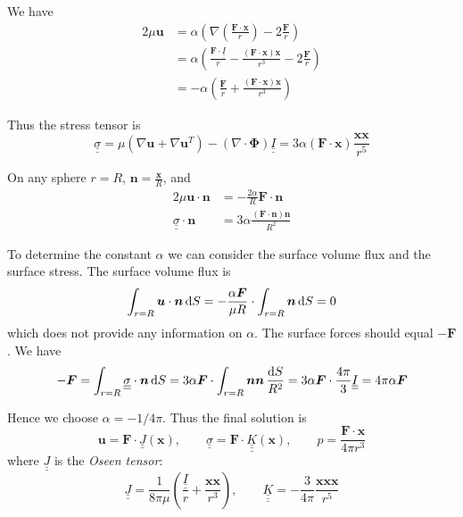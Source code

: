 \documentclass{jknotes}
\newcommand{\dunder}[1]{\underline{\underline{#1}}}
\newcommand{\x}{\bm{x}}
\begin{document}
We have
\begin{equation}
	\begin{aligned}
		2\mu \bm{u} &= \alpha \left( \nabla \left( \frac{\bm{F} \cdot
			\x}{r}\right) - 2
		\frac{\bm{F}}{r}\right) \\
		&= \alpha \left( \frac{\bm{F} \cdot \dunder{I}}{r} -
	\frac{(\bm{F}\cdot\x)\x}{r^3} - 2\frac{\bm{F}}{r}\right) \\
	&= -\alpha \left( \frac{\bm{F}}{r} + \frac{(\bm{F}\cdot\x)\x}{r^3}\right)
\end{aligned}
\end{equation}

Thus the stress tensor is
\begin{equation}
	\dunder{\sigma} = \mu \left( \nabla \bm{u} + \nabla \bm{u}^T\right) -
	\left(\nabla \cdot \bm{\Phi}\right)\dunder{I} = 3\alpha (\bm{F} \cdot
	\bm{x}) \frac{\x \x}{r^5}
\end{equation}

On any sphere $r=R$, $\bm{n} = \frac{\x}{R}$, and
\begin{equation}
	\begin{aligned}
		2\mu \bm{u}\cdot\bm{n} &= -\frac{2\alpha}{R} \bm{F}\cdot\bm{n} \\
		\dunder{\sigma} \cdot \bm{n} &= 3 \alpha \frac{(\bm{F} \cdot
		\bm{n}) \bm{n}}{R^2}
	\end{aligned}
\end{equation}

To determine the constant $\alpha$ we can consider the surface volume flux and
the surface stress. The surface volume flux is
\begin{equation}
	\int_{r=R} \bm{u}\cdot\bm{n}\,\diffd S = -\frac{\alpha \bm{F}}{\mu R}
	\cdot \int_{r=R} \bm{n} \, \diffd S = 0
\end{equation}
which does not provide any information on $\alpha$. The surface forces should
equal $-\bm{F}$. We have
\begin{equation}
	-\bm{F} = \int_{r=R} \dunder{\sigma} \cdot \bm{n} \, \diffd S = 3\alpha
	\bm{F} \cdot \int_{r=R} \bm{n} \bm{n} \, \frac{\diffd S}{R^2} = 3 \alpha
	\bm{F} \cdot \frac{4\pi}{3} \dunder{I} = 4\pi \alpha \bm{F}
\end{equation}

Hence we choose $\alpha = -1/4\pi$. Thus the final solution is
\begin{equation}
	\bm{u} = \bm{F} \cdot \dunder{J}(\x), \hspace{2em} \dunder{\sigma} =
	\bm{F} \cdot \dunder{\underline{K}}(\x), \hspace{2em} p =
	\frac{\bm{F}\cdot\x}{4\pi r^3}
\end{equation}
where $\dunder{J}$ is the \emph{Oseen tensor}:
\begin{equation}
	\dunder{J} = \frac{1}{8\pi \mu} \left( \frac{\dunder{I}}{r} +
		\frac{\x\x}{r^3}\right), \hspace{2em} \dunder{\underline{K}} =
		-\frac{3}{4\pi} \frac{\x\x\x}{r^5}
\end{equation}
\end{document}
